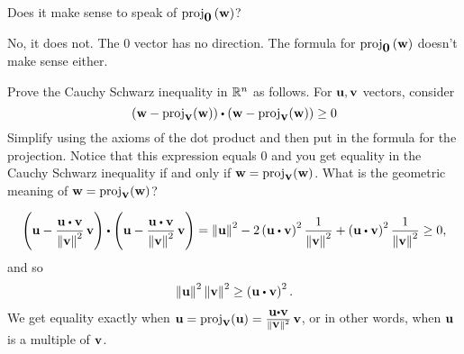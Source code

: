 \begin{enumialphparenastyle}
\begin{ex}
  Does it make sense to speak of $\mbox{\rm proj}_{\mbox{\bf 0}}\left(\mbox{\bf w}\right)$?
  \begin{sol}
    No, it does not. The $0$ vector has no direction. The formula for
    $\mbox{\rm proj}_{\mbox{\bf 0}}\left(\mbox{\bf w}\right)$ doesn't make sense either.
  \end{sol}
\end{ex}

\begin{ex}
  Prove the Cauchy Schwarz inequality in $\mathbb{R}^{n}$ as follows.  For
  $\mbox{\bf u},\mbox{\bf v}$ vectors, consider
  \begin{equation*}
    \tup{\vect{w}-
      \func{proj}_{\vect{v}}(\vect{w})} \dotprod \tup{\vect{w}-
      \func{proj}_{\vect{v}}(\vect{w})} \geq 0
  \end{equation*}
  Simplify using the axioms of the dot product and then put in the
  formula for the projection. Notice that this expression equals $0$
  and you get equality in the Cauchy Schwarz inequality if and only if
  $\mbox{\bf w}=\mbox{\rm proj}_{\mbox{\bf v}}(\mbox{\bf w})$. What is the geometric
  meaning of $\mbox{\bf w}=\mbox{\rm proj}_{\mbox{\bf v}}(\mbox{\bf w})$?
  \begin{sol}
    \[
      \tup{\vect{u}-\frac{\vect{u}\dotprod \vect{v}}{\norm{\vect{v}}
          ^{2}}\,\vect{v}} \dotprod \tup{\vect{u}-\frac{\vect{u}\dotprod
          \vect{v}}{\norm{\vect{v}} ^{2}}\,\vect{v}} =\norm{\vect{u}}
      ^{2}-2\tup{\vect{u}\dotprod \vect{v}} ^{2}\frac{1}{\norm{
          \vect{v}} ^{2}}+\tup{\vect{u}\dotprod \vect{v}}
      ^{2}\frac{1}{ \norm{\vect{v}} ^{2}}\geq 0,
    \]
    and so
    \[
      \norm{\vect{u}} ^{2}\norm{\vect{v}}
      ^{2}\geq \tup{\vect{u}\dotprod \vect{v}} ^{2}.
    \]
    We get equality exactly when
    $\vect{u}=\func{proj}_{\vect{v}}(\vect{u}) =
    \frac{\vect{u}\dotprod \vect{v}}{\norm{\vect{v}} ^{2}}\,\vect{v}$,
    or in other words, when $\mbox{\bf u}$ is a multiple of $\mbox{\bf v}$.
  \end{sol}
\end{ex}



\end{enumialphparenastyle}
